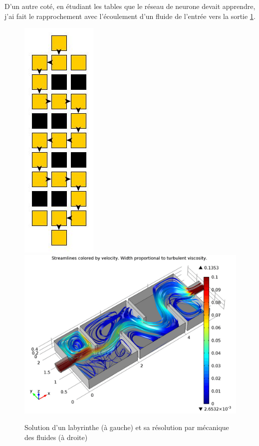 \documentclass[10pt]{article}
\begin{document}
 D'un autre coté, en étudiant les tables que le réseau de neurone devait apprendre, j'ai fait le rapprochement avec l'écoulement d'un fluide de l'entrée vers la sortie \ref{sol_meca_fluid}.

\begin{figure}[!h]
\centering
\includegraphics[scale=0.45]{ex_maze.jpg} \indent\indent
\includegraphics[scale=0.20]{navier.png}\\
\caption{Solution d'un labyrinthe (à gauche) et sa résolution par mécanique des fluides (à droite)}
\label{sol_meca_fluid}
\end{figure}
\end{document}

